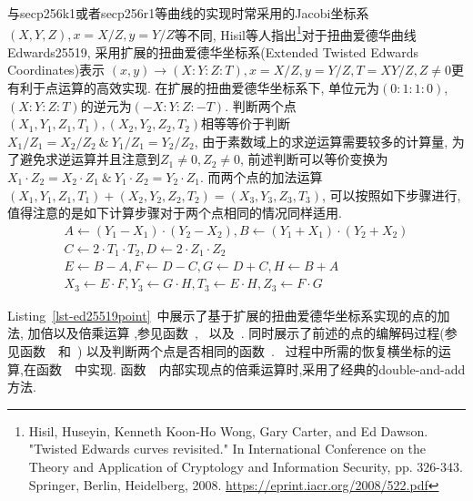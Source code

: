 与secp256k1或者secp256r1等曲线的实现时常采用的Jacobi坐标系$(X, Y, Z), x = X/Z, y = Y/Z$等不同, 
Hisil等人指出\footnote{
Hisil, Huseyin, Kenneth Koon-Ho Wong, Gary Carter, and Ed Dawson. 
"Twisted Edwards curves revisited." 
In International Conference on the Theory and Application of Cryptology and Information Security, 
pp. 326-343. Springer, Berlin, Heidelberg, 2008.
\url{https://eprint.iacr.org/2008/522.pdf}}对于扭曲爱德华曲线Edwards25519,
采用扩展的扭曲爱德华坐标系(Extended Twisted Edwards Coordinates)表示
$(x,y) \rightarrow (X : Y : Z : T), x = X/Z, y = Y/Z, T = XY/Z, Z \neq 0$更有利于点运算的高效实现.
在扩展的扭曲爱德华坐标系下, 单位元为$(0 : 1 : 1 : 0)$, $(X : Y : Z : T)$的逆元为$(-X : Y : Z : -T)$.
判断两个点$(X_1, Y_1, Z_1, T_1), (X_2, Y_2, Z_2, T_2)$相等等价于判断
$X_1/Z_1 = X_2/Z_2\ \&\ Y_1/Z_1 = Y_2/Z_2$, 由于素数域上的求逆运算需要较多的计算量,
为了避免求逆运算并且注意到$Z_1 \neq 0, Z_2 \neq 0$, 前述判断可以等价变换为
$X_1 \cdot Z_2 = X_2 \cdot Z_1\ \& \ Y_1 \cdot Z_2 = Y_2 \cdot Z_1$.
而两个点的加法运算$(X_1, Y_1, Z_1, T_1) +  (X_2, Y_2, Z_2, T_2) = (X_3, Y_3, Z_3, T_3)$,
可以按照如下步骤进行, 值得注意的是如下计算步骤对于两个点相同的情况同样适用.
\begin{equation*}
\begin{array}{c}
A \leftarrow (Y_1 - X_1) \cdot (Y_2 - X_2), B \leftarrow (Y_1 + X_1) \cdot (Y_2 + X_2) \\
C \leftarrow 2\cdot T_1 \cdot T_2, D \leftarrow 2 \cdot Z_1 \cdot Z_2 \\
E \leftarrow B - A, F \leftarrow D - C, G \leftarrow D + C, H \leftarrow B + A \\
X_3 \leftarrow E \cdot F, Y_3 \leftarrow G\cdot H, T_3 \leftarrow E \cdot H, Z_3 \leftarrow F \cdot G
\end{array}
\end{equation*}

Listing~\ref{lst-ed25519point}~中展示了基于扩展的扭曲爱德华坐标系实现的点的加法, 加倍以及倍乘运算
,参见函数~, ~以及~.
同时展示了前述的点的编解码过程(参见函数~~和~)
以及判断两个点是否相同的函数~.
~过程中所需的恢复横坐标的运算,在函数~~中实现.
函数~~内部实现点的倍乘运算时,采用了经典的double-and-add方法.



